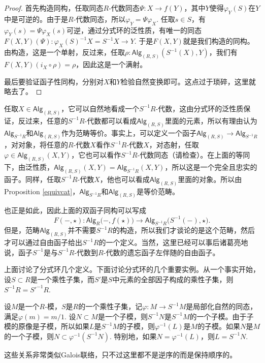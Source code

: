 \begin{proof}
	首先构造同构，任取同态$R$-代数同态$\Psi:X\to f(Y)$，其中$Y$使得$\varphi_Y(S)$在$Y$中是可逆的。由于是$R$-代数同态，所以$\varphi_Y=\Psi\varphi_X$. 任取$s\in S$，有$\varphi_Y(s)=\Psi\varphi_X(s)$可逆，通过分式环的泛性质，有唯一的同态$F(X,Y)(\Psi):\varphi_X(S)^{-1}X=S^{-1}X\to Y$. 于是$F(X,Y)$就是我们构造的同构。由构造，这是一个单射，反过来，任取$\rho:\mathsf{Alg}_{(R,S)}(S^{-1}(X),Y)$，我们有$F(X,Y)(i_X\circ \rho)=\rho$，因此这是一个满射。

	最后要验证函子性同构，分别对$X$和$Y$检验自然变换即可。这点过于琐碎，这里就略去了。
\end{proof}

任取$X\in \mathsf{Alg}_{(R,S)}$，它可以自然地看成一个$S^{-1}R$-代数，这由分式环的泛性质保证，反过来，任意的$S^{-1}R$-代数都可以看成$\mathsf{Alg}_{(R,S)}$里面的元素，所以有理由认为$\mathsf{Alg}_{S^{-1}R}$和$\mathsf{Alg}_{(R,S)}$作为范畴等价。事实上，可以定义一个函子$\mathsf{Alg}_{(R,S)}\to \mathsf{Alg}_{S^{-1}R}$，对对象，将任意的$R$-代数$X$看作$S^{-1}R$-代数$X$，对态射，任取$\varphi\in \mathsf{Alg}_{(R,S)}(X,Y)$，它也可以看作$S^{-1}R$-代数同态（请检查）。在上面的等同下，由泛性质，$\mathsf{Alg}_{(R,S)}(X,Y)=\mathsf{Alg}_{S^{-1}R}(X,Y)$，所以这是一个完全且忠实的函子。同样，任取$S^{-1}R$-代数$X$，他也可以看成$\mathsf{Alg}_{(R,S)}$里面的对象。所以由Proposition \eqref{equivcat}，$\mathsf{Alg}_{S^{-1}R}$和$\mathsf{Alg}_{(R,S)}$是等价范畴。

也正是如此，因此上面的双函子同构可以写成
\[
	F(-,\star):\mathsf{Alg}_R\bigl(-,f(\star)\bigr)\to \mathsf{Alg}_{S^{-1}R}\bigl(S^{-1}(-),\star\bigr).
\]
但是，范畴$\mathsf{Alg}_{(R,S)}$并不需要$S^{-1}R$的构造，所以我们才谈论的是这个范畴，然后才可以通过自由函子给出$S^{-1}R$的一个定义。当然，这里已经可以事后诸葛亮地说，函子$S^{-1}$是与$S^{-1}R$-代数到$R$-代数的遗忘函子左伴随的自由函子。

\para 上面讨论了分式环几个定义。下面讨论分式环的几个重要实例。从一个事实开始，设$S\subset R$是一个乘性子集，而$S'$是$S$中元素的全部因子构成的乘性子集，则$S^{-1}R=S'^{-1}R$.

\para 设$M$是一个$R$-模，$S$是$R$的一个乘性子集，记$\varphi:M\to S^{-1}M$是局部化自然的同态，满足$\varphi(m)=m/1$. 设$N\subset M$是一个子模，则$S^{-1}N$是$S^{-1}M$的一个子模。由于子模的原像是子模，所以如果$L$是$S^{-1}M$的子模，则$\varphi^{-1}(L)$是$M$的子模。如果$N$是$M$的一个子模，则$N\subset \varphi^{-1}(S^{-1}N)$. 特别地，如果$N=\varphi^{-1}(L)$，则$L=S^{-1}N$.

这些关系非常类似Galois联络，只不过这里都不是逆序的而是保持顺序的。

